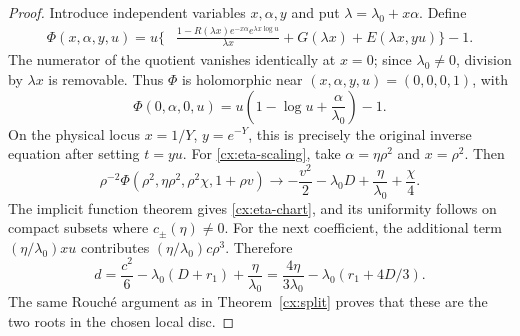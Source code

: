 \documentclass[11pt,a4paper]{article}
\numberwithin{equation}{section}
\theoremstyle{definition}
\theoremstyle{remark}
\begin{document}
\begin{proof}
Introduce independent variables $x,\alpha,y$ and put
$\lambda=\lambda_0+x\alpha$.  Define
\begin{align}
 \Phi(x,\alpha,y,u)
 =u\biggl\{&
 \frac{1-R(\lambda x)e^{-x\alpha}
                     e^{\lambda x\log u}}{\lambda x}
   +G(\lambda x)+E(\lambda x,yu)\biggr\}-1.
 \label{cx:Phi-unfolded}
\end{align}
The numerator of the quotient vanishes identically at $x=0$; since
$\lambda_0\ne0$, division by $\lambda x$ is removable.  Thus $\Phi$
is holomorphic near $(x,\alpha,y,u)=(0,0,0,1)$, with
\begin{equation}\label{cx:Phi-unfolded-limit}
 \Phi(0,\alpha,0,u)
   =u\left(1-\log u+\frac\alpha{\lambda_0}\right)-1.
\end{equation}
On the physical locus $x=1/Y$, $y=e^{-Y}$, this is precisely the original
inverse equation after setting $t=yu$.  For
\eqref{cx:eta-scaling}, take $\alpha=\eta\rho^2$ and $x=\rho^2$.
Then
\[
 \rho^{-2}\Phi(\rho^2,\eta\rho^2,\rho^2\chi,1+\rho v)
 \longrightarrow
 -\frac{v^2}{2}-\lambda_0D+\frac\eta{\lambda_0}+\frac \chi4.
\]
The implicit function theorem gives \eqref{cx:eta-chart}, and its
uniformity follows on compact subsets where $c_\pm(\eta)\ne0$.
For the next coefficient, the additional term
$(\eta/\lambda_0)x u$ contributes $(\eta/\lambda_0)c\rho^3$.
Therefore
\[
 d=\frac{c^2}{6}-\lambda_0(D+r_1)+\frac\eta{\lambda_0}
   =\frac{4\eta}{3\lambda_0}-\lambda_0(r_1+4D/3).
\]
The same Rouch\'e argument as in Theorem~\ref{cx:split} proves that
these are the two roots in the chosen local disc.
\end{proof}
\end{document}
